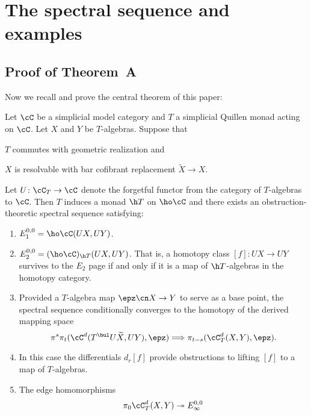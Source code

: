 \documentclass[leqno,oneside,english]{elsarticle}
\begin{document}
\section{The spectral sequence and examples}\label{sec:ss-hty-alg-maps}
\subsection{Proof of Theorem~A}\label{sec:main-theorem}
Now we recall and prove the central theorem of this paper:
\begin{thmA}
  \begin{samepage}
    Let $\cC$ be a simplicial model category and $T$ a
    simplicial Quillen monad acting on $\cC$.
    Let $X$ and $Y$ be $T$-algebras.  Suppose that
    \begin{hypothenumerate}
      \item $T$ commutes with geometric realization and
      \item $X$ is resolvable with bar cofibrant replacement $\widetilde{X} \to X$.
    \end{hypothenumerate}
  \end{samepage}
  Let $U\colon \cC_T\rightarrow \cC$ denote the forgetful functor from
  the category of $T$-algebras to $\cC$.  Then $T$ induces a monad $\h
  T$ on $\ho\cC$ and there
  exists an obstruction-theoretic spectral sequence satisfying:
  \begin{enumerate} \setlength{\itemsep}{.4pc}
    \item\label{it:e-1-0-0} $E_1^{0,0}=\ho\cC(UX,UY)$.
    \item\label{it:e-2-0-0} $E_2^{0,0}=(\ho\cC)_{\h T}(UX, UY)$.  That is,
    a homotopy class $[f] \colon UX \to UY$ survives to the $E_2$ page
    if and only if it is a map of $\h T$-algebras in the homotopy
    category.
    \item \label{it:e-2-s-t} Provided a $T$-algebra map $\epz \cn X \to
    Y$ to serve as a base point, the spectral sequence conditionally
    converges to the homotopy of the derived mapping space
      \[
      \pi^s \pi_t (\cC^d(T^{\bul}U\widetilde{X}, UY),\epz) \Longrightarrow \pi_{t-s}(\cC_T^d(X,Y),\epz).
      \]
     \item \label{it:differentials} In this case the differentials $d_r[f]$ provide obstructions to
       lifting $[f]$ to a map of $T$-algebras.
     \item \label{it:edges} The edge homomorphisms 
       \begin{align*}
	 \pi_0 \cC_T^d(X,Y)
	 &\twoheadrightarrow E_\infty^{0,0}\\

\end{align*}
\end{enumerate}
\end{thmA}
\end{document}
